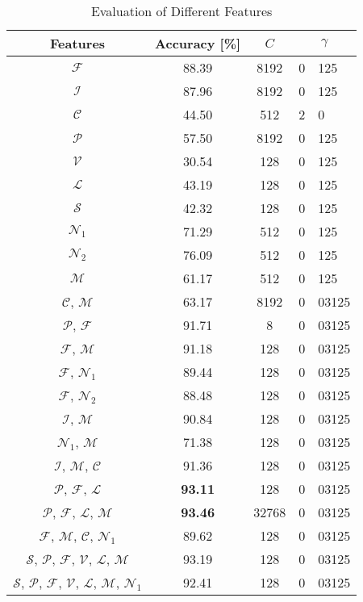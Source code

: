 \documentclass{llncs}
\begin{document}
\begin{table*}
\begin{center}%
\caption{Evaluation of Different Features}%
\begin{tabular}{c c c r@{.}l}%
\toprule%
Features & Accuracy [\%] & $C$ & \multicolumn{2}{c}{$\gamma$} \\
\midrule
$\mathcal{F}$ & 88.39 & 8192 & 0 & 125\\
$\mathcal{I}$ & 87.96 & 8192 & 0 & 125\\
$\mathcal{C}$ & 44.50 & 512 & 2 & 0\\
$\mathcal{P}$ & 57.50 & 8192 & 0 & 125\\
$\mathcal{V}$ & 30.54 & 128 & 0 & 125\\
$\mathcal{L}$ & 43.19 & 128 & 0 & 125\\
$\mathcal{S}$ & 42.32 & 128 & 0 & 125\\
$\mathcal{N}_1$ & 71.29 & 512 & 0 & 125\\
$\mathcal{N}_2$ & 76.09 & 512 & 0 & 125\\
$\mathcal{M}$ & 61.17 & 512 & 0 & 125\\
$\mathcal{C}$, $\mathcal{M}$ & 63.17 & 8192 & 0 & 03125\\
$\mathcal{P}$, $\mathcal{F}$ & 91.71 & 8 & 0 & 03125\\
$\mathcal{F}$, $\mathcal{M}$ & 91.18 & 128 & 0 & 03125\\
$\mathcal{F}$, $\mathcal{N}_1$ & 89.44 & 128 & 0 & 03125\\
$\mathcal{F}$, $\mathcal{N}_2$ & 88.48 & 128 & 0 & 03125\\
$\mathcal{I}$, $\mathcal{M}$ & 90.84 & 128 & 0 & 03125\\
$\mathcal{N}_1$, $\mathcal{M}$ & 71.38 & 128 & 0 & 03125\\
$\mathcal{I}$, $\mathcal{M}$, $\mathcal{C}$ & 91.36 & 128 & 0 & 03125\\
$\mathcal{P}$, $\mathcal{F}$, $\mathcal{L}$ & \textbf{93.11} & 128 & 0 & 03125\\
$\mathcal{P}$, $\mathcal{F}$, $\mathcal{L}$, $\mathcal{M}$ & \textbf{93.46} & 32768 & 0 & 03125\\
$\mathcal{F}$, $\mathcal{M}$, $\mathcal{C}$, $\mathcal{N}_1$ & 89.62 & 128 & 0 & 03125\\
$\mathcal{S}$, $\mathcal{P}$, $\mathcal{F}$, $\mathcal{V}$, $\mathcal{L}$, $\mathcal{M}$ & 93.19 & 128 & 0 & 03125\\
$\mathcal{S}$, $\mathcal{P}$, $\mathcal{F}$, $\mathcal{V}$, $\mathcal{L}$, $\mathcal{M}$, $\mathcal{N}_1$ & 92.41 & 128 & 0 & 03125\\
\bottomrule%
\end{tabular}%
\label{tbl:eval}%
\end{center}
\end{table*}
\end{document}
